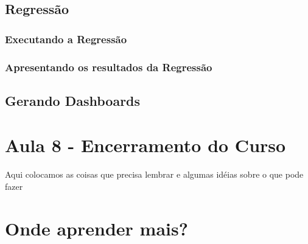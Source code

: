 \documentclass[12pt,a4paper,oneside]{erdc}
\begin{document}
	\section{Regressão}
	
		\subsection{Executando a Regressão}
		
		\subsection{Apresentando os resultados da Regressão}
	
	\section{Gerando Dashboards}

%
%


%
%
%


\chapter{Aula 8 - Encerramento do Curso}


Aqui colocamos as coisas que precisa lembrar e algumas idéias sobre o que pode fazer


\chapter{Onde aprender mais?}



%








\end{document}
